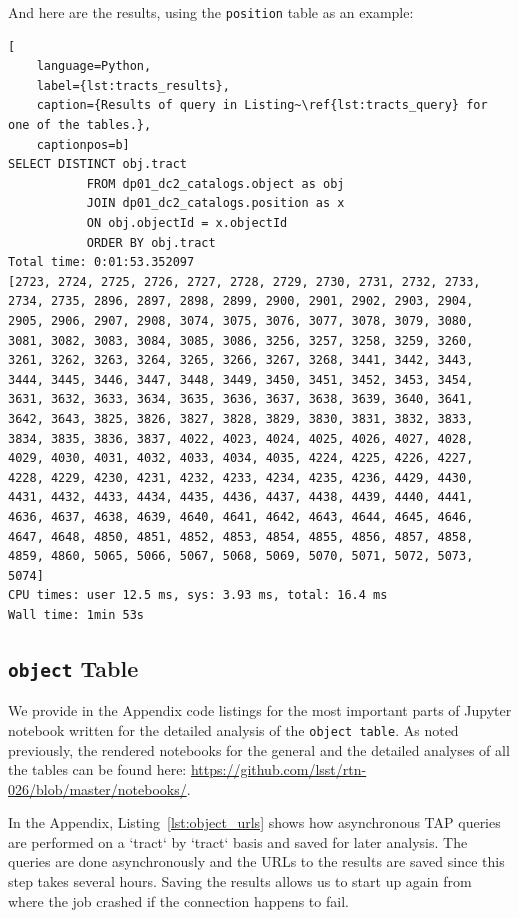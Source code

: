 \documentclass[DM,authoryear,toc]{lsstdoc}
\newenvironment{allintypewriter}{\ttfamily}{\par}
\begin{document}
And here are the results, using the \texttt{position} table as an example:
\begin{lstlisting}[
    language=Python,
    label={lst:tracts_results},
    caption={Results of query in Listing~\ref{lst:tracts_query} for one of the tables.},
    captionpos=b]
SELECT DISTINCT obj.tract 
           FROM dp01_dc2_catalogs.object as obj
           JOIN dp01_dc2_catalogs.position as x
           ON obj.objectId = x.objectId  
           ORDER BY obj.tract
Total time: 0:01:53.352097
[2723, 2724, 2725, 2726, 2727, 2728, 2729, 2730, 2731, 2732, 2733, 2734, 2735, 2896, 2897, 2898, 2899, 2900, 2901, 2902, 2903, 2904, 2905, 2906, 2907, 2908, 3074, 3075, 3076, 3077, 3078, 3079, 3080, 3081, 3082, 3083, 3084, 3085, 3086, 3256, 3257, 3258, 3259, 3260, 3261, 3262, 3263, 3264, 3265, 3266, 3267, 3268, 3441, 3442, 3443, 3444, 3445, 3446, 3447, 3448, 3449, 3450, 3451, 3452, 3453, 3454, 3631, 3632, 3633, 3634, 3635, 3636, 3637, 3638, 3639, 3640, 3641, 3642, 3643, 3825, 3826, 3827, 3828, 3829, 3830, 3831, 3832, 3833, 3834, 3835, 3836, 3837, 4022, 4023, 4024, 4025, 4026, 4027, 4028, 4029, 4030, 4031, 4032, 4033, 4034, 4035, 4224, 4225, 4226, 4227, 4228, 4229, 4230, 4231, 4232, 4233, 4234, 4235, 4236, 4429, 4430, 4431, 4432, 4433, 4434, 4435, 4436, 4437, 4438, 4439, 4440, 4441, 4636, 4637, 4638, 4639, 4640, 4641, 4642, 4643, 4644, 4645, 4646, 4647, 4648, 4850, 4851, 4852, 4853, 4854, 4855, 4856, 4857, 4858, 4859, 4860, 5065, 5066, 5067, 5068, 5069, 5070, 5071, 5072, 5073, 5074]
CPU times: user 12.5 ms, sys: 3.93 ms, total: 16.4 ms
Wall time: 1min 53s
\end{lstlisting}



\subsection{\texttt{object} Table} \label{sec:object}

We provide in the Appendix code listings for the most important parts
of Jupyter notebook written for the detailed analysis of the \texttt{object table}.
As noted previously, the rendered notebooks for the general and the detailed analyses of
all the tables can be found here:
\url{https://github.com/lsst/rtn-026/blob/master/notebooks/}.

In the Appendix, Listing~\ref{lst:object_urls} shows how asynchronous
TAP queries are performed on a `tract` by `tract` basis and saved for
later analysis.  The queries are done asynchronously and the URLs to
the results are saved since this step takes several hours.  Saving the
results allows us to start up again from where the job crashed if the
connection happens to fail.
\end{document}
